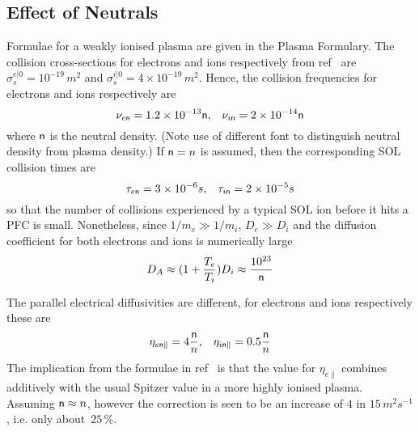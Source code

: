 \subsection{Effect of Neutrals}\label{sec:neuts}
Formulae for a weakly ionised plasma are given in the Plasma Formulary\cite{NRLpf07}.
The collision cross-sections for electrons and ions respectively from
ref~\cite{Ha91hydr} are $\sigma_s^{e|0}= 10^{-19}$\,$m^2$ and
$\sigma_s^{i|0}= 4 \times 10^{-19}$\,$m^2$.
Hence, the collision frequencies for electrons and ions respectively are
\begin{equation}
\nu_{e{\sf n}}= 1.2 \times 10^{-13} {\sf n},\;\;\; \nu_{i{\sf n}}= 2 \times 10^{-14} {\sf n}
\end{equation}
where ${\sf n}$ is the neutral density.
(Note use of different font to distinguish neutral density from plasma density.)
If ${\sf n}=n$ is assumed, then
the corresponding SOL collision times are
\begin{equation}
\tau_{e{\sf n}}= 3 \times 10^{-6} s,\;\;\; \tau_{i{\sf n}}= 2 \times 10^{-5} s
\end{equation}
so that the number of collisions experienced by a typical SOL ion
before it hits a PFC is small.
Nonetheless, since $1/m_e \gg 1/m_i$, $D_e \gg D_i$ and the
diffusion coefficient for both electrons and ions is numerically large
\begin{equation}
D_A \approx (1+\frac{T_e}{T_i}) D_i \approx \frac{10^{23}}{{\sf n}}
\end{equation}

The parallel electrical diffusivities are different,
for electrons and ions respectively these are
\begin{equation}
\eta_{e {\sf n}\parallel} =4 \frac{{\sf n}}{n},\;\;\;
\eta_{i {\sf n}\parallel} =0.5 \frac{{\sf n}}{n}
\end{equation}
The implication from the formulae in ref~\cite{Le06emer} is that 
the value for $\eta_{e \parallel}$ combines additively with the usual
Spitzer value in a more
highly ionised plasma. Assuming ${\sf n} \approx n$, however the correction
is seen to be an increase of $4$ in $15$\,$m^2s^{-1}$, i.e. only about~$25$\,\%.

